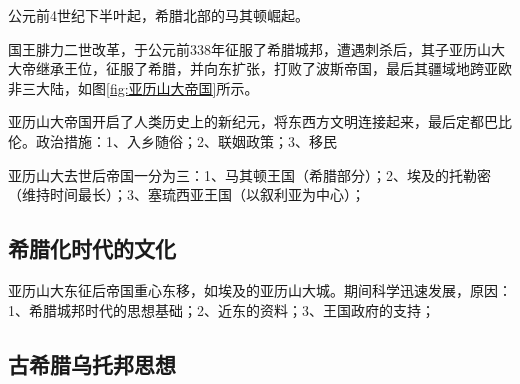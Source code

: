 公元前4世纪下半叶起，希腊北部的马其顿崛起。

国王腓力二世改革，于公元前338年征服了希腊城邦，遭遇刺杀后，其子亚历山大大帝继承王位，征服了希腊，并向东扩张，打败了波斯帝国，最后其疆域地跨亚欧非三大陆，如图\ref{fig:亚历山大帝国}所示。

亚历山大帝国开启了人类历史上的新纪元，将东西方文明连接起来，最后定都巴比伦。政治措施：1、入乡随俗；2、联姻政策；3、移民


亚历山大去世后帝国一分为三：1、马其顿王国（希腊部分）；2、埃及的托勒密（维持时间最长）；3、塞琉西亚王国（以叙利亚为中心）；

\subsection{希腊化时代的文化}

亚历山大东征后帝国重心东移，如埃及的亚历山大城。期间科学迅速发展，原因：1、希腊城邦时代的思想基础；2、近东的资料；3、王国政府的支持；

\subsection{古希腊乌托邦思想}
